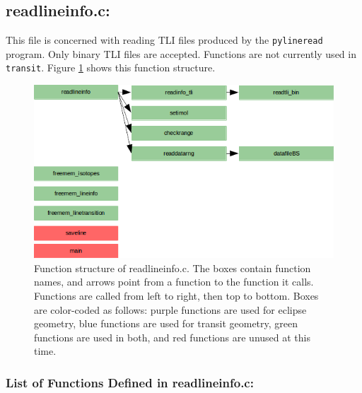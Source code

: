 \documentclass[letterpaper,12pt]{article}
\begin{document}
\newpage
\subsection{readlineinfo.c:}
This file is concerned with reading TLI files produced by the {\tt pylineread} program. Only binary TLI files are accepted. Functions  are not currently used in {\tt transit}. Figure \ref{fig:readlineinfoc} shows this function structure.

\begin{figure}
\includegraphics{fig/readlineinfoc}
\caption{Function structure of readlineinfo.c. The boxes contain function names, and arrows point from a function to the function it calls. Functions are called from left to right, then top to bottom.  Boxes are color-coded as follows:  purple functions are used for eclipse geometry, blue functions are used for transit geometry, green functions are used in both, and red functions are unused at this time.}
\label{fig:readlineinfoc}
\end{figure}

\subsubsection{List of Functions Defined in readlineinfo.c:}
 \newline

 \newline
\end{document}
